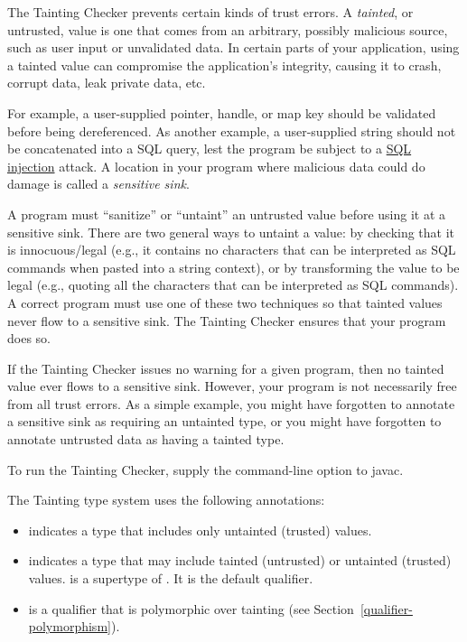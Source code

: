 \htmlhr
{}

The Tainting Checker prevents certain kinds of trust errors.
A \emph{tainted}, or untrusted, value is one that comes from an arbitrary,
possibly malicious source, such as user input or unvalidated data.
In certain parts of your application, using a tainted value can compromise
the application's integrity, causing it to crash, corrupt data, leak
private data, etc.


For example, a user-supplied pointer, handle, or map key should be
validated before being dereferenced.
As another example, a user-supplied string should not be concatenated into a
SQL query, lest the program be subject to a
\href{https://en.wikipedia.org/wiki/Sql_injection}{SQL injection} attack.
A location in your program where malicious data could do damage is
called a \emph{sensitive sink}.

A program must ``sanitize'' or ``untaint'' an untrusted value before using
it at a sensitive sink.  There are two general ways to untaint a value:
by checking
that it is innocuous/legal (e.g., it contains no characters that can be
interpreted as SQL commands when pasted into a string context), or by
transforming the value to be legal (e.g., quoting all the characters that
can be interpreted as SQL commands).  A correct program must use one of
these two techniques so that tainted values never flow to a sensitive sink.
The Tainting Checker ensures that your program does so.

If the Tainting Checker issues no warning for a given program, then no
tainted value ever flows to a sensitive sink.  However, your program is not
necessarily free from all trust errors.  As a simple example, you might
have forgotten to annotate a sensitive sink as requiring an untainted type,
or you might have forgotten to annotate untrusted data as having a tainted
type.

To run the Tainting Checker, supply the
command-line option to javac.




The Tainting type system uses the following annotations:
\begin{itemize}
\item
   indicates
  a type that includes only untainted (trusted) values.
\item
   indicates
  a type that may include tainted (untrusted) or untainted (trusted) values.
   is a supertype of .
  It is the default qualifier.
\item
   is a qualifier that is
  polymorphic over tainting (see Section~\ref{qualifier-polymorphism}).
\end{itemize}


